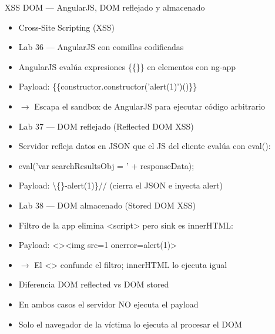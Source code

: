 \documentclass[aspectratio=169,10pt]{beamer}
\newcommand{\cmdbox}[1]{%
  \begin{center}%
  {\setlength{\fboxsep}{6pt}\colorbox{uzlav!40}{\parbox{0.88\linewidth}{\ttfamily\footnotesize #1}}}%
  \end{center}}
\begin{document}
\begin{frame}[allowframebreaks]{XSS DOM --- AngularJS, DOM reflejado y almacenado}
\small
  \begin{itemize}
  \item Cross-Site Scripting (XSS)
  \item Lab 36 --- AngularJS con comillas codificadas
  \item AngularJS evalúa expresiones \{\{\}\} en elementos con ng-app
  \item Payload: \{\{constructor.constructor('alert(1)')()\}\}
  \item $\rightarrow$ Escapa el sandbox de AngularJS para ejecutar código arbitrario
  \item Lab 37 --- DOM reflejado (Reflected DOM XSS)
  \item Servidor refleja datos en JSON que el JS del cliente evalúa con eval():
  \item[] \cmdbox{eval('var searchResultsObj = ' + responseData);}
  \item Payload: \textbackslash\{\}\textquotedbl{}-alert(1)\}// (cierra el JSON e inyecta alert)
  \item Lab 38 --- DOM almacenado (Stored DOM XSS)
  \item Filtro de la app elimina \textless{}script\textgreater{} pero sink es innerHTML:
  \item Payload: \textless{}\textgreater{}\textless{}img src=1 onerror=alert(1)\textgreater{}
  \item $\rightarrow$ El \textless{}\textgreater{} confunde el filtro; innerHTML lo ejecuta igual
  \item Diferencia DOM reflected vs DOM stored
  \item En ambos casos el servidor NO ejecuta el payload
  \item Solo el navegador de la víctima lo ejecuta al procesar el DOM
  \end{itemize}
\end{frame}
\end{document}
